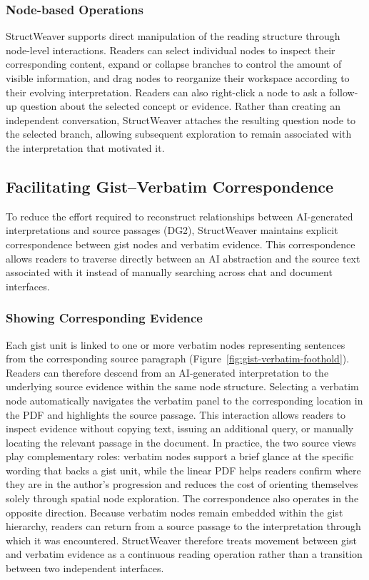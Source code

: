 \documentclass[manuscript,review,anonymous]{acmart}
\begin{document}
\subsubsection{Node-based Operations}
StructWeaver supports direct manipulation of the reading structure through node-level interactions. Readers can select individual nodes to inspect their corresponding content, expand or collapse branches to control the amount of visible information, and drag nodes to reorganize their workspace according to their evolving interpretation. Readers can also right-click a node to ask a follow-up question about the selected concept or evidence. Rather than creating an independent conversation, StructWeaver attaches the resulting question node to the selected branch, allowing subsequent exploration to remain associated with the interpretation that motivated it.

\subsection{Facilitating Gist--Verbatim Correspondence}
\label{sec:text-to-concept}

To reduce the effort required to reconstruct relationships between AI-generated interpretations and source passages (DG2), StructWeaver maintains explicit correspondence between gist nodes and verbatim evidence. This correspondence allows readers to traverse directly between an AI abstraction and the source text associated with it instead of manually searching across chat and document interfaces.

\subsubsection{Showing Corresponding Evidence}
Each gist unit is linked to one or more verbatim nodes representing sentences from the corresponding source paragraph (Figure~\ref{fig:gist-verbatim-foothold}). Readers can therefore descend from an AI-generated interpretation to the underlying source evidence within the same node structure. Selecting a verbatim node automatically navigates the verbatim panel to the corresponding location in the PDF and highlights the source passage. This interaction allows readers to inspect evidence without copying text, issuing an additional query, or manually locating the relevant passage in the document. In practice, the two source views play complementary roles: verbatim nodes support a brief glance at the specific wording that backs a gist unit, while the linear PDF helps readers confirm where they are in the author's progression and reduces the cost of orienting themselves solely through spatial node exploration. The correspondence also operates in the opposite direction. Because verbatim nodes remain embedded within the gist hierarchy, readers can return from a source passage to the interpretation through which it was encountered. StructWeaver therefore treats movement between gist and verbatim evidence as a continuous reading operation rather than a transition between two independent interfaces.
\end{document}
